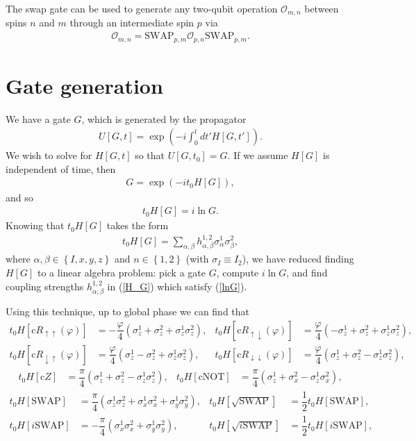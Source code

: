 \documentclass[11pt]{article}
\renewcommand{\t}{\text} %
\newcommand{\f}[2]{\dfrac{#1}{#2}} %
\newcommand{\p}[1]{\left(#1\right)} %
\renewcommand{\sp}[1]{\left[#1\right]} %
\renewcommand{\set}[1]{\left\{#1\right\}} %
\renewcommand{\d}{\partial} %
\renewcommand{\phi}{\varphi} %
\renewcommand{\u}{\uparrow}
\renewcommand{\d}{\downarrow}
\begin{document}
The swap gate can be used to generate any two-qubit operation
$\mathcal O_{m,n}$ between spins $n$ and $m$ through an intermediate
spin $p$ via
\begin{align}
  \mathcal O_{m,n}=\t{SWAP}_{p,m}\mathcal O_{p,n}\t{SWAP}_{p,m}.
\end{align}


\newpage
\section*{Gate generation}

We have a gate $G$, which is generated by the propagator
\begin{align}
  U\sp{G,t}=\exp\p{-i\int_0^tdt'H\sp{G,t'}}.
\end{align}
We wish to solve for $H\sp{G,t}$ so that $U\sp{G,t_0}=G$. If we assume
$H\sp{G}$ is independent of time, then
\begin{align}
  G=\exp\p{-it_0H\sp{G}},
\end{align}
and so
\begin{align}
  t_0H\sp{G}=i\ln G. \label{lnG}
\end{align}
Knowing that $t_0H\sp{G}$ takes the form
\begin{align}
  t_0H\sp{G}
  =\sum_{\alpha,\beta}h_{\alpha,\beta}^{1,2}\sigma_\alpha^1\sigma_\beta^2,
  \label{H_G}
\end{align}
where $\alpha,\beta\in\set{I,x,y,z}$ and $n\in\set{1,2}$ (with
$\sigma_I\equiv I_2$), we have reduced finding $H\sp{G}$ to a linear
algebra problem: pick a gate $G$, compute $i\ln G$, and find coupling
strengths $h_{\alpha,\beta}^{1,2}$ in (\ref{H_G}) which satisfy
(\ref{lnG}).

Using this technique, up to global phase we can find that
\begin{align}
  t_0H\sp{\t{c}R_{\u\u}\p\phi}&=-\f\phi4\p{\sigma_z^1+\sigma_z^2
    +\sigma_z^1\sigma_z^2}, &
  t_0H\sp{\t{c}R_{\u\d}\p\phi}&=\f\phi4\p{-\sigma_z^1+\sigma_z^2
    +\sigma_z^1\sigma_z^2}, \\
  t_0H\sp{\t{c}R_{\d\u}\p\phi}&=\f\phi4\p{\sigma_z^1-\sigma_z^2
    +\sigma_z^1\sigma_z^2}, & t_0H\sp{\t{c}R_{\d\d}\p\phi}
  &=\f\phi4\p{\sigma_z^1+\sigma_z^2 -\sigma_z^1\sigma_z^2},
\end{align}
\begin{align}
  t_0H\sp{\t{c}Z}
  &=\f\pi4\p{\sigma_z^1+\sigma_z^2-\sigma_z^1\sigma_z^2}, &
  t_0H\sp{\t{cNOT}}
  &=\f\pi4\p{\sigma_z^1+\sigma_x^2-\sigma_z^1\sigma_x^2},
\end{align}
\begin{align}
  t_0H\sp{\t{SWAP}}&=\f\pi4\p{\sigma_z^1\sigma_z^2
    +\sigma_x^1\sigma_x^2+\sigma_y^1\sigma_y^2}, &
  t_0H\sp{\sqrt{\t{SWAP}}}&=\f12t_0H\sp{\t{SWAP}}, \\
  t_0H\sp{i\t{SWAP}}&=-\f\pi4\p{\sigma_x^1\sigma_x^2
    +\sigma_y^1\sigma_y^2}, &
  t_0H\sp{\sqrt{i\t{SWAP}}}&=\f12t_0H\sp{i\t{SWAP}},
\end{align}
\end{document}
